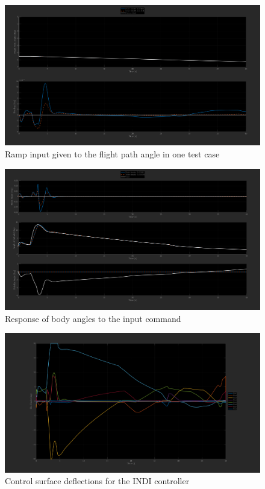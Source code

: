 \documentclass[12pt]{article}
\numberwithin{equation}{section}
\numberwithin{figure}{section}
\numberwithin{table}{section}
\begin{document}
\begin{figure}[H]
  \centering
  \includegraphics[width=1\textwidth]{Figures/GammaCommand.png}
  \caption{Ramp input given to the flight path angle in one test case}
  \label{fig:GammaCmd}
\end{figure}
\begin{figure}[H]
  \centering
  \includegraphics[width=1\textwidth]{Figures/GammaCommandAngles.png}
  \caption{Response of body angles to the input command}
  \label{fig:GammaCmdAng}
\end{figure}
\begin{figure}[H]
  \centering
  \includegraphics[width=1\textwidth]{Figures/GammaCommandINDIFinDeflect.png}
  \caption{Control surface deflections for the INDI controller}
  \label{fig:GammaCmdFin}
\end{figure}
\end{document}
